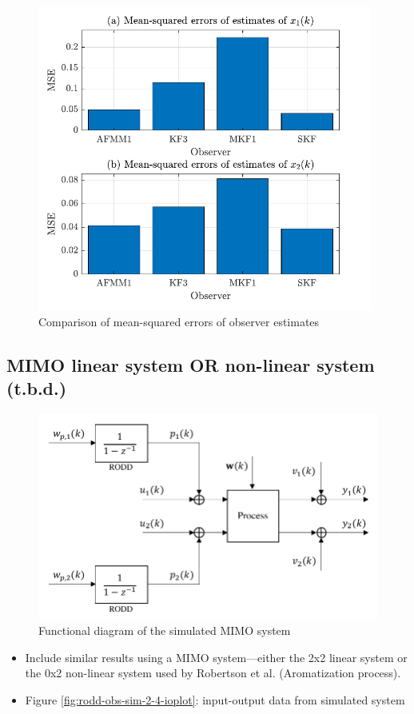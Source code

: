 \begin{figure}[htp]
	\centering
	\includegraphics[width=11cm]{images/rod-obs-sim-1-7-MSE-DRAFT.pdf}
	\caption{Comparison of mean-squared errors of observer estimates}
	\label{fig:rod-obs-sim-1-7-MSE}
\end{figure}

\subsection{MIMO linear system OR non-linear system (t.b.d.)}

\begin{figure}[htp]
	\centering
	\includegraphics[width=11.5cm]{images/sim-sys-diag-2x2.pdf}
	\caption{Functional diagram of the simulated MIMO system}
	\label{fig:sim-sys-diag-2x2}
\end{figure}

\begin{itemize}
	\item Include similar results using a MIMO system—either the 2x2 linear system or the 0x2 non-linear system used by Robertson et al. (Aromatization process).
	\item Figure \ref{fig:rodd-obs-sim-2-4-ioplot}: input-output data from simulated system
\end{itemize}

